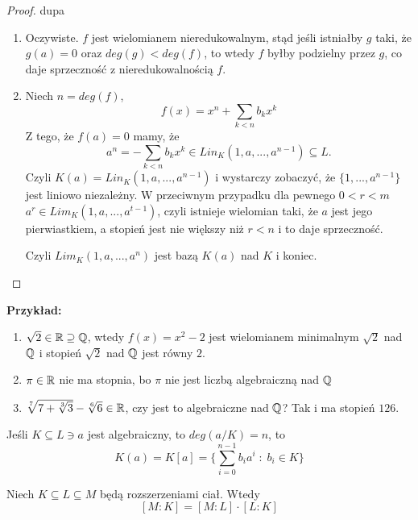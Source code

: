 \begin{proof}{\color{pagColor}dupa}

\begin{enumerate}
\item Oczywiste. $f$ jest wielomianem nieredukowalnym, stąd jeśli istniałby $g$ taki, że $g(a)=0$ oraz $deg(g)<deg(f)$, to wtedy $f$ byłby podzielny przez $g$, co daje sprzeczność z nieredukowalnością $f$.


\item Niech $n=deg(f)$, 
$$f(x)=x^n+\sum\limits_{k<n}b_kx^k$$
Z tego, że $f(a)=0$ mamy, że 
$$a^n=-\sum\limits_{k<n}b_kx^k\in Lin_K(1,a,...,a^{n-1})\subseteq L.$$
Czyli $K(a)=Lin_K(1,a,...,a^{n-1})$ i wystarczy zobaczyć, że $\{1,..., a^{n-1}\}$ jest liniowo niezależny. W przeciwnym przypadku dla pewnego $0<r<m$ $a^r\in Lim_K(1,a,...,a^{t-1})$, czyli istnieje wielomian taki, że $a$ jest jego pierwiastkiem, a stopień jest nie większy niż $r<n$ i to daje sprzeczność.

Czyli $Lim_K(1,a,...,a^n)$ jest bazą $K(a)$ nad $K$ i koniec.
\end{enumerate}
\end{proof}
\textbf{Przykład:}
\begin{enumerate}
    \item $\sqrt{2}\in\mathbb{R}\supseteq\mathbb{Q}$, wtedy $f(x)=x^2-2$ jest wielomianem minimalnym $\sqrt2$ nad $\mathbb{Q}$ i stopień $\sqrt{2}$ nad $\mathbb{Q}$ jest równy $2$.
    \item $\pi\in\mathbb{R}$ nie ma stopnia, bo $\pi$ nie jest liczbą algebraiczną nad $\mathbb{Q}$
    \item  $\sqrt[7]{7+\sqrt[3]{3}}-\sqrt[6]{6}\in\mathbb{R}$, czy jest to algebraiczne nad $\mathbb{Q}$? Tak i ma stopień $126$.
\end{enumerate}

Jeśli $K\subseteq L\ni a$ jest algebraiczny, to $deg(a/K)=n$, to 
$$K(a)=K[a]=\{\sum\limits_{i=0}^{n-1}b_ia^i\;:\;b_i\in K\}$$

\begin{fact}[$dim_K(M)=dim_L(M)\cdot dim_K(L)$]\label{fakt:4:6}
    Niech $K\subseteq L\subseteq M$ będą rozszerzeniami ciał. Wtedy 
    $$[M:K]=[M:L]\cdot [L:K]$$
\end{fact}

